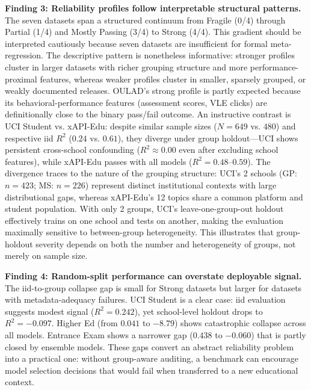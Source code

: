 \documentclass[10pt,letterpaper]{wlscirep}
\begin{document}
\textbf{Finding 3: Reliability profiles follow interpretable structural patterns.} The seven datasets span a structured continuum from Fragile (0/4) through Partial (1/4) and Mostly Passing (3/4) to Strong (4/4). This gradient should be interpreted cautiously because seven datasets are insufficient for formal meta-regression. The descriptive pattern is nonetheless informative: stronger profiles cluster in larger datasets with richer grouping structure and more performance-proximal features, whereas weaker profiles cluster in smaller, sparsely grouped, or weakly documented releases. OULAD's strong profile is partly expected because its behavioral-performance features (assessment scores, VLE clicks) are definitionally close to the binary pass/fail outcome. An instructive contrast is UCI Student vs. xAPI-Edu: despite similar sample sizes ($N = 649$ vs. $480$) and respective iid $R^2$ ($0.24$ vs. $0.61$), they diverge under group holdout---UCI shows persistent cross-school confounding ($R^2 \approx 0.00$ even after excluding school features), while xAPI-Edu passes with all models ($R^2 = 0.48$--$0.59$). The divergence traces to the nature of the grouping structure: UCI's 2 schools (GP: $n=423$; MS: $n=226$) represent distinct institutional contexts with large distributional gaps, whereas xAPI-Edu's 12 topics share a common platform and student population. With only 2 groups, UCI's leave-one-group-out holdout effectively trains on one school and tests on another, making the evaluation maximally sensitive to between-group heterogeneity. This illustrates that group-holdout severity depends on both the number and heterogeneity of groups, not merely on sample size.

\textbf{Finding 4: Random-split performance can overstate deployable signal.} The iid-to-group collapse gap is small for Strong datasets but larger for datasets with metadata-adequacy failures. UCI Student is a clear case: iid evaluation suggests modest signal ($R^2 = 0.242$), yet school-level holdout drops to $R^2 = -0.097$. Higher Ed (from $0.041$ to $-8.79$) shows catastrophic collapse across all models. Entrance Exam shows a narrower gap ($0.438$ to $-0.060$) that is partly closed by ensemble models. These gaps convert an abstract reliability problem into a practical one: without group-aware auditing, a benchmark can encourage model selection decisions that would fail when transferred to a new educational context.
\end{document}
